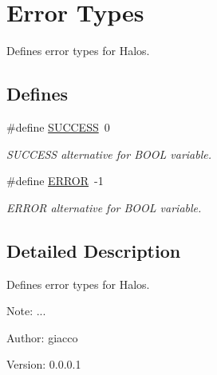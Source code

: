 \hypertarget{group___e_r_r_o_r_t_y_p_e_s}{
\section{Error Types}
\label{group___e_r_r_o_r_t_y_p_e_s}
}
Defines error types for Halos.  


\subsection*{Defines}
\begin{CompactItemize}
\item 
\hypertarget{group___e_r_r_o_r_t_y_p_e_s_ga90cac659d18e8ef6294c7ae337f6b58}{
\#define \hyperlink{group___e_r_r_o_r_t_y_p_e_s_ga90cac659d18e8ef6294c7ae337f6b58}{SUCCESS}~0}
\label{group___e_r_r_o_r_t_y_p_e_s_ga90cac659d18e8ef6294c7ae337f6b58}

\begin{CompactList}\small\item\em SUCCESS alternative for BOOL variable. \item\end{CompactList}\item 
\hypertarget{group___e_r_r_o_r_t_y_p_e_s_g8fe83ac76edc595f6b98cd4a4127aed5}{
\#define \hyperlink{group___e_r_r_o_r_t_y_p_e_s_g8fe83ac76edc595f6b98cd4a4127aed5}{ERROR}~-1}
\label{group___e_r_r_o_r_t_y_p_e_s_g8fe83ac76edc595f6b98cd4a4127aed5}

\begin{CompactList}\small\item\em ERROR alternative for BOOL variable. \item\end{CompactList}\end{CompactItemize}


\subsection{Detailed Description}
Defines error types for Halos. 

\begin{Desc}
\item[Note:]... \end{Desc}
\begin{Desc}
\item[Author:]giacco \end{Desc}
\begin{Desc}
\item[Version:]0.0.0.1 \end{Desc}
